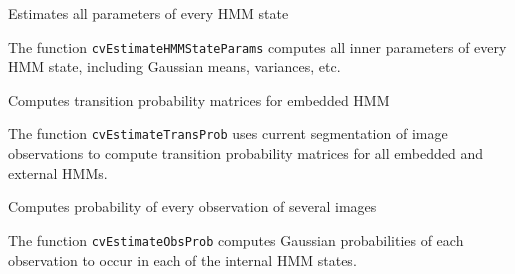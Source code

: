 {Estimates all parameters of every HMM state


\begin{description}
\end{description}

The function \texttt{cvEstimateHMMStateParams} computes all inner parameters of every HMM state, including Gaussian means, variances, etc.


Computes transition probability matrices for embedded HMM


\begin{description}
\end{description}

The function \texttt{cvEstimateTransProb} uses current segmentation of image observations to compute transition probability matrices for all embedded and external HMMs.


Computes probability of every observation of several images


\begin{description}
\end{description}

The function \texttt{cvEstimateObsProb} computes Gaussian probabilities of each observation to occur in each of the internal HMM states.

}

